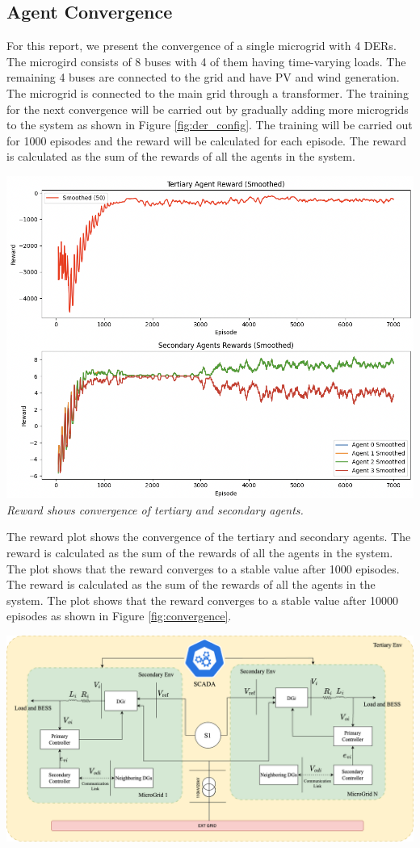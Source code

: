 \documentclass[11pt]{article}
\begin{document}
\subsection{Agent Convergence}
For this report, we present the convergence of a single microgrid with 4 DERs. The microgird consists of 8 buses with 4 of them having time-varying loads. The remaining 4 buses are connected to the grid and have PV and wind generation. The microgrid is connected to the main grid through a transformer.
The training for the next convergence will be carried out by gradually adding more microgrids to the system as shown in Figure \ref{fig:der_config}. The training will be carried out for 1000 episodes and the reward will be calculated for each episode. The reward is calculated as the sum of the rewards of all the agents in the system.

\includegraphics[width=0.9\linewidth]{./reward_plot.png} 
\label{fig:convergence}
\textit{Reward shows convergence of tertiary and secondary agents.}

The reward plot shows the convergence of the tertiary and secondary agents. The reward is calculated as the sum of the rewards of all the agents in the system. The plot shows that the reward converges to a stable value after 1000 episodes. The reward is calculated as the sum of the rewards of all the agents in the system. 
The plot shows that the reward converges to a stable value after 10000 episodes as shown in Figure \ref{fig:convergence}.

\includegraphics[width=0.9\linewidth]{./der_config.png} 
\label{fig:der_config}
\end{document}
